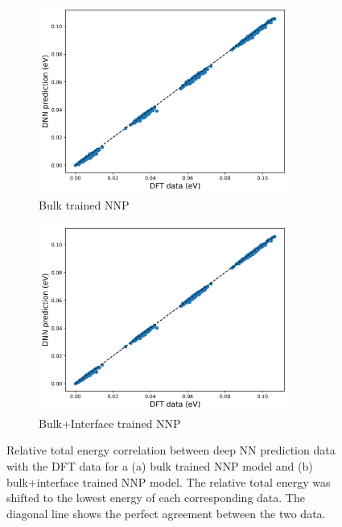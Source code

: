 \begin{figure}[tbhp!]
	\centering
	\begin{subfigure}{0.47\textwidth}
		\centering

		\includegraphics[width=0.9\textwidth]{images/bulk_NN_on_interface/2_e_peratom.png}
		\caption{Bulk trained NNP}
		\label{fig:corr_bulk_NN_E}
	\end{subfigure}
	\hfill
	\begin{subfigure}{0.47\textwidth}
		\centering

		\includegraphics[width=0.9\textwidth]{images/bulk+interface_NN_on_interface/2_e_peratom.png}
		\caption{Bulk+Interface trained NNP}
		\label{fig:corr_bulk+interface_NN_E}
	\end{subfigure}
	\caption{Relative total energy correlation between deep NN prediction data with
		the DFT data
		for a
		(a) bulk trained NNP model and (b) bulk+interface trained NNP
		model. The relative total energy was shifted to the lowest energy of each corresponding data. The diagonal line shows the perfect agreement between the two
		data.}
	\label{fig:corr_E}
\end{figure}

